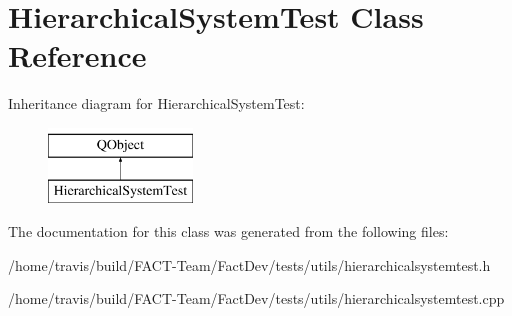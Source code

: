 \hypertarget{classHierarchicalSystemTest}{\section{Hierarchical\-System\-Test Class Reference}
\label{classHierarchicalSystemTest}
}
Inheritance diagram for Hierarchical\-System\-Test\-:\begin{figure}[H]
\begin{center}
\leavevmode
\includegraphics[height=2.000000cm]{dd/d86/classHierarchicalSystemTest}
\end{center}
\end{figure}


The documentation for this class was generated from the following files\-:\begin{DoxyCompactItemize}
\item 
/home/travis/build/\-F\-A\-C\-T-\/\-Team/\-Fact\-Dev/tests/utils/hierarchicalsystemtest.\-h\item 
/home/travis/build/\-F\-A\-C\-T-\/\-Team/\-Fact\-Dev/tests/utils/hierarchicalsystemtest.\-cpp\end{DoxyCompactItemize}
